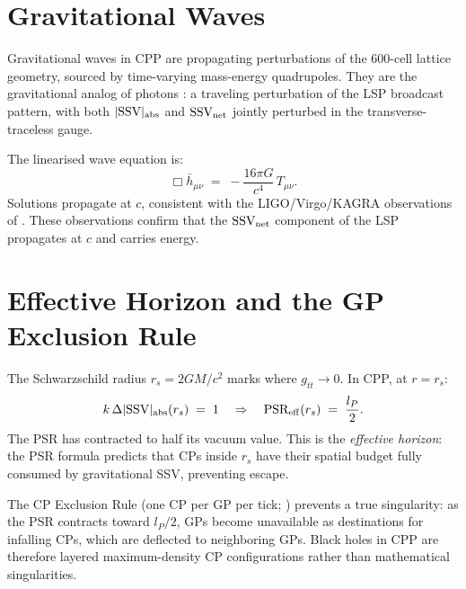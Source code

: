 \documentclass[12pt]{article}
\newcommand{\lP}{l_P}
\newcommand{\SSV}{\text{SSV}}
\newcommand{\PSR}{\text{PSR}}
\begin{document}
\section{Gravitational Waves}
\label{sec:GW}

Gravitational waves in CPP are propagating perturbations of the
600-cell lattice geometry, sourced by time-varying mass-energy
quadrupoles.  They are the gravitational analog of photons
\citep{abshier2026zdc}: a traveling perturbation of the LSP broadcast
pattern, with both $|\SSV|_{\rm abs}$ and $\mathbf{\SSV}_{\rm net}$
jointly perturbed in the transverse-traceless gauge.

The linearised wave equation is:
\begin{equation}
  \Box\bar{h}_{\mu\nu} \;=\; -\frac{16\pi G}{c^4}\,T_{\mu\nu}.
  \label{eq:GW}
\end{equation}
Solutions propagate at $c$, consistent with the LIGO/Virgo/KAGRA
observations of \citet{abbott2016}.  These observations confirm that
the $\mathbf{\SSV}_{\rm net}$ component of the LSP propagates at $c$
and carries energy.

\section{Effective Horizon and the GP Exclusion Rule}
\label{sec:BH}

The Schwarzschild radius $r_s = 2GM/c^2$ marks where $g_{tt} \to 0$.
In CPP, at $r = r_s$:
\begin{equation}
  k\,\Delta|\SSV|_{\rm abs}(r_s) \;=\; 1
  \quad\Rightarrow\quad
  \PSR_{\rm eff}(r_s) \;=\; \frac{\lP}{2}.
  \label{eq:horizon}
\end{equation}
The PSR has contracted to half its vacuum value.  This is the
\emph{effective horizon}: the PSR formula \citep[Eq.~1]{abshier2026sr}
predicts that CPs inside $r_s$ have their spatial budget fully consumed
by gravitational SSV, preventing escape.

The CP Exclusion Rule (one CP per GP per tick;
\citealt[{\S}2]{abshier2026am}) prevents a true singularity: as the
PSR contracts toward $\lP/2$, GPs become unavailable as destinations
for infalling CPs, which are deflected to neighboring GPs.  Black holes
in CPP are therefore layered maximum-density CP configurations rather
than mathematical singularities.
\end{document}
